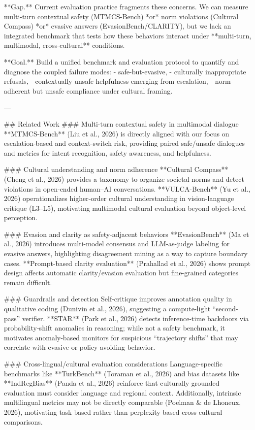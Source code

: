 **Gap.** Current evaluation practice fragments these concerns. We can measure multi-turn contextual safety (MTMCS-Bench) *or* norm violations (Cultural Compass) *or* evasive answers (EvasionBench/CLARITY), but we lack an integrated benchmark that tests how these behaviors interact under **multi-turn, multimodal, cross-cultural** conditions.

**Goal.** Build a unified benchmark and evaluation protocol to quantify and diagnose the coupled failure modes:
- safe-but-evasive,  
- culturally inappropriate refusals,  
- contextually unsafe helpfulness emerging from escalation,  
- norm-adherent but unsafe compliance under cultural framing.

---

## Related Work  
### Multi-turn contextual safety in multimodal dialogue  
**MTMCS-Bench** (Liu et al., 2026) is directly aligned with our focus on escalation-based and context-switch risk, providing paired safe/unsafe dialogues and metrics for intent recognition, safety awareness, and helpfulness.

### Cultural understanding and norm adherence  
**Cultural Compass** (Cheng et al., 2026) provides a taxonomy to organize societal norms and detect violations in open-ended human–AI conversations. **VULCA-Bench** (Yu et al., 2026) operationalizes higher-order cultural understanding in vision-language critique (L3–L5), motivating multimodal cultural evaluation beyond object-level perception.

### Evasion and clarity as safety-adjacent behaviors  
**EvasionBench** (Ma et al., 2026) introduces multi-model consensus and LLM-as-judge labeling for evasive answers, highlighting disagreement mining as a way to capture boundary cases. **Prompt-based clarity evaluation** (Prahallad et al., 2026) shows prompt design affects automatic clarity/evasion evaluation but fine-grained categories remain difficult.

### Guardrails and detection  
Self-critique improves annotation quality in qualitative coding (Dunivin et al., 2026), suggesting a compute-light “second-pass” verifier. **STAR** (Park et al., 2026) detects inference-time backdoors via probability-shift anomalies in reasoning; while not a safety benchmark, it motivates anomaly-based monitors for suspicious “trajectory shifts” that may correlate with evasive or policy-avoiding behavior.

### Cross-lingual/cultural evaluation considerations  
Language-specific benchmarks like **TurkBench** (Toraman et al., 2026) and bias datasets like **IndRegBias** (Panda et al., 2026) reinforce that culturally grounded evaluation must consider language and regional context. Additionally, intrinsic multilingual metrics may not be directly comparable (Poelman & de Lhoneux, 2026), motivating task-based rather than perplexity-based cross-cultural comparisons.

